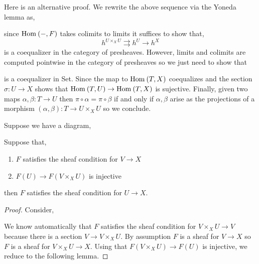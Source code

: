 \documentclass[12pt]{article}
\begin{document}
\begin{rmk}
Here is an alternative proof. We rewrite the above sequence via the Yoneda lemma as,
\begin{center}
\end{center}
since $\mathrm{Hom}_{} \left( -, F \right)$ takes colimits to limits it suffices to show that,
\[ h^{U \times_X U} \rightrightarrows h^U \to h^X \]
is a coequalizer in the category of presheaves. However, limits and colimits are computed pointwise in the category of presheaves so we just need to show that
\begin{center}
\end{center}
is a coequalizer in Set. Since the map to $\mathrm{Hom}_{} \left( T, X \right)$ coequalizes and the section $\sigma : U \to X$ shows that $\mathrm{Hom}_{} \left( T, U \right) \to \mathrm{Hom}_{} \left( T, X \right)$ is sujective. Finally, given two maps $\alpha, \beta : T \to U$ then $\pi \circ \alpha = \pi \circ \beta$ if and only if $\alpha, \beta$ arise as the projections of a morphism $(\alpha, \beta) : T \to U \times_X U$ so we conclude.
\end{rmk}

\begin{cor}
Suppose we have a diagram,
\begin{center}
\end{center}
Suppose that,
\begin{enumerate}
\item $F$ satisfies the sheaf condition for $V \to X$

\item $F(U) \to F(V \times_X U)$ is injective 
\end{enumerate}
then $F$ satisfies the sheaf condition for $U \to X$.
\end{cor}

\begin{proof}
Consider,
\begin{center}
\end{center}
We know automatically that $F$ satisfies the sheaf condition for $V \times_X U \to V$ because there is a section $V \to V \times_X U$. By assumption $F$ is a sheaf for $V \to X$ so $F$ is a sheaf for $V \times_X U \to X$. Using that $F(V \times_X U) \to F(U)$ is injective, we reduce to the following lemma. 
\end{proof}
\end{document}
